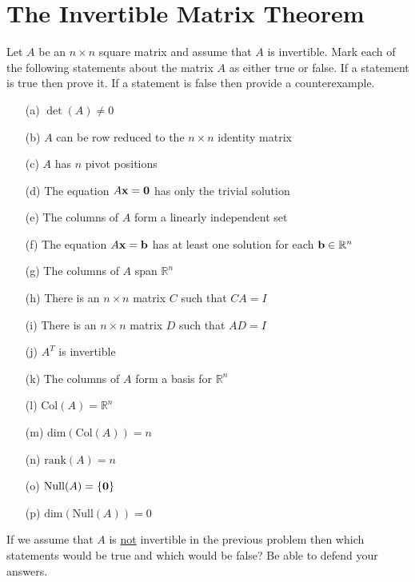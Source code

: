 \newpage
\section{The Invertible Matrix Theorem}
\begin{problem}
    Let $A$ be an $n \times n$ square matrix and assume that $A$ is invertible.  Mark each
    of the following statements about the matrix $A$ as either true or false. If a
    statement is true then prove it.  If a statement is false then provide a
    counterexample.
    \begin{enumerate}
        \item[(a)] $\det(A) \ne 0$ \vfill
        \item[(b)] $A$ can be row reduced to the $n \times n$ identity matrix \vfill
        \item[(c)] $A$ has $n$ pivot positions \vfill
        \item[(d)] The equation $A {\bf x} = {\bf 0}$ has only the trivial solution \vfill
        \item[(e)] The columns of $A$ form a linearly independent set \vfill
        \item[(f)] The equation $A {\bf x} = {\bf b}$ has at least one solution for each ${\bf b} \in
            \mathbb{R}^n$ \vfill
        \item[(g)] The columns of $A$ span $\mathbb{R}^n$ \vfill
        \item[(h)] There is an $n \times n$ matrix $C$ such that $CA = I$ \vfill
        \item[(i)] There is an $n \times n$ matrix $D$ such that $AD = I$ \vfill
        \item[(j)] $A^T$ is invertible \vfill
        \item[(k)] The columns of $A$ form a basis for $\mathbb{R}^n$ \vfill
        \item[(l)] $\text{Col}(A) = \mathbb{R}^n$ \vfill
        \item[(m)] $\text{dim}(\text{Col}(A)) = n$ \vfill
        \item[(n)] $\text{rank}(A) = n$ \vfill
        \item[(o)] $\text{Null}(A) = \{ {\bf 0} \}$ \vfill
        \item[(p)] $\text{dim}(\text{Null}(A)) = 0$ \vfill
    \end{enumerate}
\end{problem}

\begin{problem}
    If we assume that $A$ is \underline{not} invertible in the previous problem then which
    statements would be true and which would be false? Be able to defend your answers.
\end{problem}

